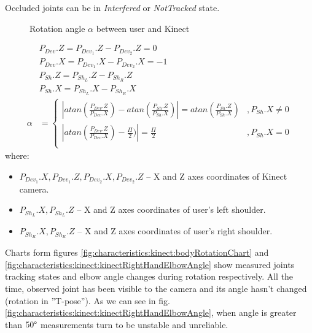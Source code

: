\documentclass{llncs}
\begin{document}
Occluded joints can be in \textsl{Interfered} or \textsl{NotTracked} state.

\begin{figure}[h!]		
	\centering
	\vspace{2.5cm}
	\caption{Rotation angle $\alpha$ between user and Kinect}
	\label{fig:characteristics:kinect:bodyRotationAngle}
\end{figure}	

\begin{equation}   
	\label{eq:characteristics:kinect:bodyRotationAngle}
	\begin{split}
		&P_{Dev}.Z = P_{{Dev}_1}.Z - P_{{Dev}_2}.Z = 0 \\
		&P_{Dev}.X = P_{{Dev}_1}.X - P_{{Dev}_2}.X = -1 \\
		&P_{Sh}.Z = P_{{Sh}_L}.Z - P_{{Sh}_R}.Z \\
		&P_{Sh}.X = P_{{Sh}_L}.X - P_{{Sh}_R}.X \\
		\alpha &= 
		\begin{cases} 
			|atan(\frac{P_{Dev}.Z}{P_{Dev}.X}) - atan(\frac{P_{Sh}.Z}{P_{Sh}.X})| = atan(\frac{P_{Sh}.Z}{P_{Sh}.X}) & , P_{Sh}.X \neq 0 \\
			|atan(\frac{P_{Dev}.Z}{P_{Dev}.X}) - \frac{\Pi}{2})| = \frac{\Pi}{2}                                    & , P_{Sh}.X = 0    \\		
		\end{cases}
	\end{split}
\end{equation}
where:
\begin{itemize}
	\item $P_{{Dev}_1}.X, P_{{Dev}_1}.Z, P_{{Dev}_2}.X, P_{{Dev}_2}.Z$ -- X and Z axes coordinates of Kinect camera.
	\item $P_{{Sh}_L}.X, P_{{Sh}_L}.Z$ -- X and Z axes coordinates of user's left shoulder.
	\item $P_{{Sh}_R}.X, P_{{Sh}_R}.Z$ -- X and Z axes coordinates of user's right shoulder.
\end{itemize}

Charts form figures \ref{fig:characteristics:kinect:bodyRotationChart} and \ref{fig:characteristics:kinect:kinectRightHandElbowAngle} show measured joints tracking states and elbow angle changes during rotation respectively. All the time, observed joint has been visible to the camera and its angle hasn't changed (rotation in ''T-pose''). As we can see in fig. \ref{fig:characteristics:kinect:kinectRightHandElbowAngle}, when angle is greater than $50 \degree$ measurements turn to be unstable and unreliable.
\end{document}
